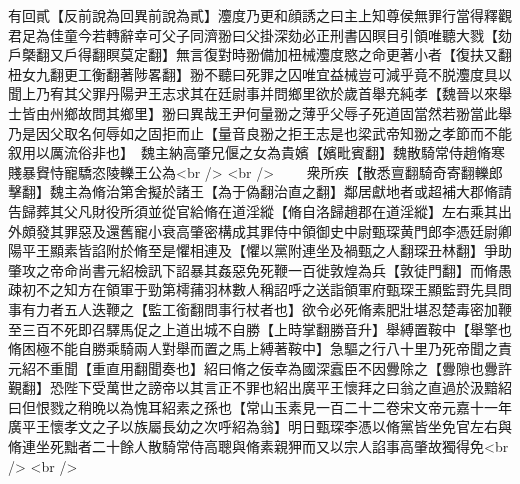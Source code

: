有回貳【反前說為回異前說為貳】灋度乃更和顔誘之曰主上知尊侯無罪行當得釋觀君足為佳童今若轉辭幸可父子同濟翂曰父掛深劾必正刑書囚瞑目引領唯聽大戮【劾戶槩翻又戶得翻瞑莫定翻】無言復對時翂備加杻械灋度愍之命更著小者【復扶又翻杻女九翻更工衡翻著陟畧翻】翂不聽曰死罪之囚唯宜益械豈可減乎竟不脱灋度具以聞上乃宥其父罪丹陽尹王志求其在廷尉事并問鄉里欲於歲首舉充純孝【魏晉以來舉士皆由州鄉故問其鄉里】翂曰異哉王尹何量翂之薄乎父辱子死道固當然若翂當此舉乃是因父取名何辱如之固拒而止【量音良翂之拒王志是也梁武帝知翂之孝節而不能叙用以厲流俗非也】　魏主納高肇兄偃之女為貴嬪【嬪毗賓翻】魏散騎常侍趙脩寒賤暴䝿恃寵驕恣陵轢王公為<br />
<br />
　　衆所疾【散悉亶翻騎奇寄翻轢郎擊翻】魏主為脩治第舍擬於諸王【為于偽翻治直之翻】鄰居獻地者或超補大郡脩請告歸葬其父凡財役所須並從官給脩在道淫縱【脩自洛歸趙郡在道淫縱】左右乘其出外頗發其罪惡及還舊寵小衰高肇密構成其罪侍中領御史中尉甄琛黄門郎李憑廷尉卿陽平王顯素皆諂附於脩至是懼相連及【懼以黨附連坐及禍甄之人翻琛丑林翻】爭助肇攻之帝命尚書元紹檢訊下詔暴其姦惡免死鞭一百徙敦煌為兵【敦徒門翻】而脩愚疎初不之知方在領軍于勁第樗蒱羽林數人稱詔呼之送詣領軍府甄琛王顯監罸先具問事有力者五人迭鞭之【監工銜翻問事行杖者也】欲令必死脩素肥壯堪忍楚毒密加鞭至三百不死即召驛馬促之上道出城不自勝【上時掌翻勝音升】舉縛置鞍中【舉擎也脩困極不能自勝乘騎兩人對舉而置之馬上縛著鞍中】急驅之行八十里乃死帝聞之責元紹不重聞【重直用翻聞奏也】紹曰脩之佞幸為國深蠧臣不因釁除之【釁隙也釁許覲翻】恐陛下受萬世之謗帝以其言正不罪也紹出廣平王懷拜之曰翁之直過於汲黯紹曰但恨戮之稍晩以為愧耳紹素之孫也【常山玉素見一百二十二卷宋文帝元嘉十一年廣平王懷孝文之子以族屬長幼之次呼紹為翁】明日甄琛李憑以脩黨皆坐免官左右與脩連坐死黜者二十餘人散騎常侍高聰與脩素親狎而又以宗人諂事高肇故獨得免<br />
<br />
